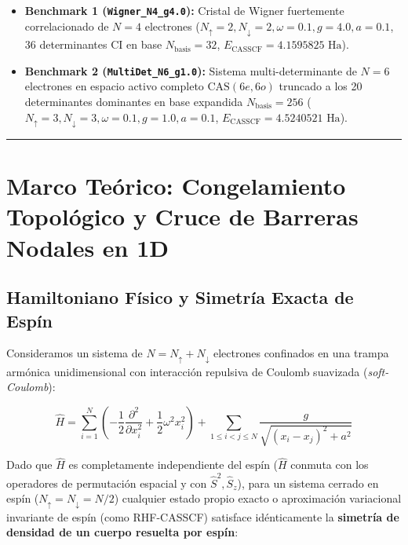 \documentclass[10pt,a4paper]{article}
\begin{document}
\begin{itemize}
\item \textbf{Benchmark 1 (\texttt{Wigner\_N4\_g4.0}):} Cristal de Wigner fuertemente correlacionado de $N=4$ electrones ($N_\uparrow=2, N_\downarrow=2, \omega=0.1, g=4.0, a=0.1$, 36 determinantes CI en base $N_{\mathrm{basis}}=32$, $E_{\mathrm{CASSCF}} = 4.1595825\text{ Ha}$).
\item \textbf{Benchmark 2 (\texttt{MultiDet\_N6\_g1.0}):} Sistema multi-determinante de $N=6$ electrones en espacio activo completo $\mathrm{CAS}(6e, 6o)$ truncado a los 20 determinantes dominantes en base expandida $N_{\mathrm{basis}}=256$ ($N_\uparrow=3, N_\downarrow=3, \omega=0.1, g=1.0, a=0.1$, $E_{\mathrm{CASSCF}} = 4.5240521\text{ Ha}$).
\end{itemize}




\vspace{0.4cm}\hrule\vspace{0.4cm}




\section{Marco Teórico: Congelamiento Topológico y Cruce de Barreras Nodales en 1D}




\subsection{Hamiltoniano Físico y Simetría Exacta de Espín}

Consideramos un sistema de $N = N_\uparrow + N_\downarrow$ electrones confinados en una trampa armónica unidimensional con interacción repulsiva de Coulomb suavizada (\textit{soft-Coulomb}):



\[
\hat{H} = \sum_{i=1}^{N} \left( -\frac{1}{2}\frac{\partial^2}{\partial x_i^2} + \frac{1}{2}\omega^2 x_i^2 \right) + \sum_{1 \le i < j \le N} \frac{g}{\sqrt{(x_i - x_j)^2 + a^2}}
\]



Dado que $\hat{H}$ es completamente independiente del espín ($\hat{H}$ conmuta con los operadores de permutación espacial y con $\hat{S}^2, \hat{S}_z$), para un sistema cerrado en espín ($N_\uparrow = N_\downarrow = N/2$) cualquier estado propio exacto o aproximación variacional invariante de espín (como RHF-CASSCF) satisface idénticamente la \textbf{simetría de densidad de un cuerpo resuelta por espín}:
\end{document}
